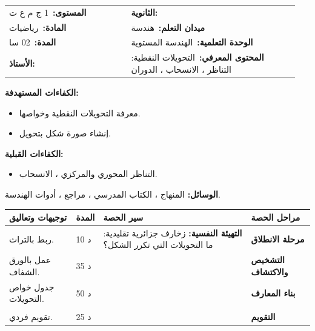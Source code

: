 \documentclass[12pt,a4paper]{article}
\makeatletter
\newenvironment{LTR}{\begin{otherlanguage}{english}}{\end{otherlanguage}}
\newcommand{\ar}[1]{\foreignlanguage{arabic}{#1}}
\newcommand{\Phase}[1]{\textbf{#1}}
\newcommand{\Fld}[2]{\textbf{#1:}\ #2}
\newcommand{\ModhHead}[9]{%
\begin{LTR}
\begin{tcolorbox}[enhanced,colback=white,colframe=cThm!85!black,arc=4mm,boxrule=1pt,top=14pt,bottom=6pt,left=8pt,right=8pt,
 overlay={\node[fill=cThm!85!black,text=white,rounded corners=3mm,inner xsep=14pt,inner ysep=4pt,font=\large\bfseries] at ([yshift=0pt]frame.north){\ar{مذكرة رقم #1}};},
 before upper={\selectlanguage{arabic}}]
\begin{tabular}{@{}p{0.4\linewidth}p{0.55\linewidth}@{}}
\Fld{المستوى}{#2} & \Fld{الثانوية}{\dotfill}\\[3pt]
\Fld{المادة}{رياضيات} & \Fld{ميدان التعلم}{#3}\\[3pt]
\Fld{المدة}{#5} & \Fld{الوحدة التعلمية}{#4}\\[3pt]
\Fld{الأستاذ}{\dotfill} & \Fld{المحتوى المعرفي}{#6}\\
\end{tabular}
\end{tcolorbox}
\begin{tcolorbox}[enhanced,colback=white,colframe=cThm!85!black,arc=3mm,boxrule=0.8pt,sidebyside,sidebyside align=top,lefthand ratio=0.5,
 segmentation style={dashed,cThm!60},before upper={\selectlanguage{arabic}},before lower={\selectlanguage{arabic}}]
\textbf{الكفاءات المستهدفة:}\par #8
\tcblower
\textbf{الكفاءات القبلية:}\par #7
\end{tcolorbox}
\end{LTR}
\par\smallskip\textbf{الوسائل:} #9\par\smallskip}
\newenvironment{Sayr}{%
\begin{LTR}\renewcommand{\arraystretch}{1.25}
\begin{longtable}{|p{0.17\textwidth}|>{\centering\arraybackslash}p{0.06\textwidth}|p{0.53\textwidth}|>{\centering\arraybackslash}p{0.12\textwidth}|}
\hline\rowcolor{cThm!12}\ar{\textbf{توجيهات وتعاليق}} & \ar{\textbf{المدة}} & \ar{\textbf{سير الحصة}} & \ar{\textbf{مراحل الحصة}}\\\hline\endhead
\hline\endfoot}{\end{longtable}\end{LTR}}
\newcommand{\Row}[4]{\ar{\small #4} & \ar{#3} & \ar{#2} & \cellcolor{cThm!8}\ar{\Phase{#1}}\\\hline}
\newcommand{\Lab}[2]{\foreignlanguage{english}{\tcbox[on line,colback=#1,colframe=#1,boxrule=0pt,arc=2pt,boxsep=1pt,left=5pt,right=5pt,top=1pt,bottom=1pt]{\ar{\textcolor{white}{\textbf{#2}}}}}}
\newcommand{\ck}{\ensuremath{{\color{cRem}\checkmark}}}
\makeatother
\begin{document}
\newpage
\ModhHead{41}{1 ج م ع ت}{هندسة}{الهندسة المستوية}{02 سا}{التحويلات النقطية: التناظر ، الانسحاب ، الدوران}%
{\begin{itemize}\item التناظر المحوري والمركزي ، الانسحاب.\end{itemize}}%
{\begin{itemize}\item معرفة التحويلات النقطية وخواصها.\item إنشاء صورة شكل بتحويل.\end{itemize}}%
{المنهاج ، الكتاب المدرسي ، مراجع ، أدوات الهندسة.}
\begin{Sayr}
\Row{مرحلة الانطلاق}{%
\textbf{التهيئة النفسية:} زخارف جزائرية تقليدية: ما التحويلات التي تكرر الشكل؟}{10 د}{ربط بالتراث.}
\Row{التشخيص والاكتشاف}{%
\Lab{cEx}{مناقشة نشاط 08 صفحة 211}\par\ck\ بالورق الشفاف: صورة مثلث بانسحاب أو تناظر أو دوران مثلث يقايسه.\par
\ck\ التناظر المحوري يعكس اتجاه الدوران ، والانسحاب والتناظر المركزي والدوران تحافظ عليه.\par
}{35 د}{عمل بالورق الشفاف.}
\Row{بناء المعارف}{%
\Lab{cDef}{تعريف}\par\ck\ \textbf{الانسحاب} الذي شعاعه $\vec u$: $\overrightarrow{MM^{\prime}}=\vec u$.\par
\ck\ \textbf{التناظر المركزي} بالنسبة إلى $O$: $O$ منتصف $[MM^{\prime}]$.\par
\ck\ \textbf{التناظر المحوري} بالنسبة إلى $(\Delta)$: $(\Delta)$ محور $[MM^{\prime}]$.\par
\ck\ \textbf{الدوران} الذي مركزه $O$ وزاويته $\theta$: $OM^{\prime}=OM$ و $\widehat{MOM^{\prime}}=\theta$ في الاتجاه المحدد.\par
\Lab{cThm}{خاصية}\ هذه التحويلات تحافظ على الأطوال والزوايا والمساحات والاستقامية والتوازي: صورة شكل شكل يقايسه.\par}{50 د}{جدول خواص التحويلات.}
\Row{}{%
\Lab{cEx}{مثال}\ صورة دائرة مركزها $O$ ونصف قطرها $3$ بانسحاب هي دائرة نصف قطرها $3$ ومركزها صورة $O$.\par\Lab{cThm!80!black}{حذار}\ التناظر المركزي دوران زاويته $180^\circ$.}{}{}
\Row{التقويم}{%
\Lab{cEx}{تطبيق}\par $ABCD$ مربع مركزه $O$. ما صورة المربع بالدوران الذي مركزه $O$ وزاويته $90^\circ$ ؟\par\textbf{الحل:} المربع نفسه: $A\mapsto B$ ، $B\mapsto C$ ، $C\mapsto D$ ، $D\mapsto A$ (في الاتجاه المناسب).\par\textbf{واجب منزلي:} تمارين من الكتاب المدرسي.\par\smallskip\textbf{ملاحظات حول سير الحصة:} \dotfill}{25 د}{تقويم فردي.}
\end{Sayr}
\end{document}
